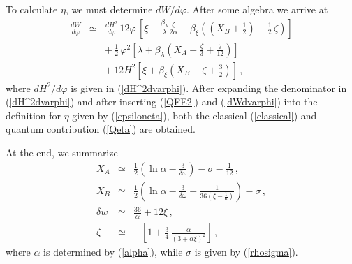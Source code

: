 \documentclass[aps,12pt,superscriptaddress,preprintnumbers,
                secnumarabic,nofootinbib,showpacs]{revtex4}
\begin{document}
To calculate $\eta$, we must determine ${dW}/{d\varphi}$.
After some algebra we arrive at
\begin{eqnarray}
\frac{dW}{d\varphi}&\simeq&\frac{dH^2}{d\varphi}\,12\varphi\,\left[\xi
-\frac{\beta_{\lambda}}{\lambda}\frac{\zeta}{2\alpha}
+ \beta_{\xi}\left((X_B+\frac12)-\frac12\,\zeta\right)\right]\nonumber\\
&&+\,\frac12\,\varphi^2\left[\lambda+\beta_{\lambda}\left(X_A +
\frac{\zeta}{3}+\frac{7}{12} \right)\right]\nonumber\\
&&
+\,12H^2\left[\xi+\beta_{\xi}\left(X_B+\zeta+\frac32\right)\right]\,,\label{dWdvarphi}
\end{eqnarray}
where ${dH^2}/{d\varphi}$ is given in (\ref{dH^2dvarphi}).
After expanding the denominator in (\ref{dH^2dvarphi}) and after
inserting (\ref{QFE2}) and (\ref{dWdvarphi}) into the definition
for $\eta$ given by (\ref{epsiloneta}), both the classical
(\ref{classical}) and quantum contribution (\ref{Qeta}) are obtained.

At the end, we summarize
\begin{eqnarray}
X_A &\simeq& \frac12\left(\ln\alpha -\frac{3}{\delta\omega}\right)
-\sigma-\frac{1}{12}
\,,\nonumber\\
X_B &\simeq& \frac12\left(\ln\alpha
-\frac{3}{\delta\omega}+\frac{1}{36\left(\xi-\frac16\right)}\right)-\sigma\,,\nonumber\\
\delta w &\simeq& \frac{36}{\alpha} + 12\xi\,,\nonumber\\
\zeta &\simeq&
-\left[1+\frac34\,\frac{\alpha}{(3+\alpha\xi)^2}\right]\,,
\end{eqnarray}
where $\alpha$ is determined by (\ref{alpha}), while
$\sigma$ is given by (\ref{rhosigma}).
\end{document}
